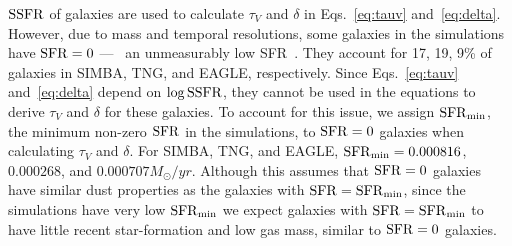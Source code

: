 
${\rm SSFR}$ of galaxies are used to calculate $\tau_V$ and $\delta$ in
Eqs.~\ref{eq:tauv} and~\ref{eq:delta}. However, due to mass and temporal resolutions,
some galaxies in the simulations have ${\rm SFR}=0$ --- \ie~an unmeasurably low
SFR~\citep{hahn2019c}. They account for 17, 19, 9\% of galaxies
in SIMBA, TNG, and EAGLE, respectively. Since Eqs.~\ref{eq:tauv}
and~\ref{eq:delta} depend on $\log{\rm SSFR}$, they cannot be used in the equations
to derive $\tau_V$ and $\delta$ for these galaxies. To account for this issue,
we assign ${\rm SFR}_{\rm min}$, the minimum non-zero ${\rm SFR}$ in the simulations, to
${\rm SFR}=0$ galaxies when calculating $\tau_V$ and $\delta$. For SIMBA, TNG, and
EAGLE, ${\rm SFR}_{\rm min}=0.000816$, $0.000268$, and $0.000707 M_\odot/yr$. Although 
this assumes that ${\rm SFR}=0$ galaxies have similar dust properties as the galaxies 
with ${\rm SFR} = {\rm SFR}_{\rm min}$, since the simulations have very low ${\rm SFR}_{\rm min}$ 
we expect galaxies with ${\rm SFR} = {\rm SFR}_{\rm min}$ to have little recent
star-formation and low gas mass, similar to ${\rm SFR}=0$ galaxies. 


